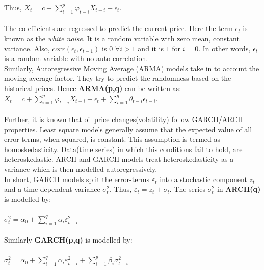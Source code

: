 \documentclass[runningheads]{llncs}
\begin{document}
\noindent Thus, $ X_{t} = c + \sum\limits_{i=1}^p \varphi_{t-i}X_{t-i} + \epsilon_{t}$.\\\\

\noindent The co-efficients are regressed to predict the current price. Here the term $\epsilon_{t}$ is known as the \textit{white noise}. It is a random variable with zero mean, constant variance. Also, $corr(\epsilon_t,\epsilon_{t-1})$ is $0$ $\forall i>1$ and it is $1$ for $i=0$. In other words, $\epsilon_{t}$ is a random variable with no auto-correlation.\\

\noindent Similarly, Autoregressive Moving Average (ARMA) models take in to account the moving average factor. They try to predict the randomness based on the historical prices.  Hence \textbf{ARMA(p,q)} can be written as:\\

$ X_{t} = c + \sum\limits_{i=1}^p \varphi_{t-i}X_{t-i} + \epsilon_{t} + \sum\limits_{i=1}^q \theta_{t-i}\epsilon_{t-i}$.\\
\\

\noindent Further, it is known that oil price changes(volatility) follow GARCH/ARCH properties. Least square models generally assume that the expected value of all error terms, when squared, is constant. This assumption is termed as homoskedasticity. Data(time series) in which this conditions fail to hold, are heteroskedastic. ARCH and GARCH models treat heteroskedasticity as a variance which is then modelled autoregressively.\cite{engle}\\

\noindent In short, GARCH models split the error-terms $\varepsilon_t$ into a stochastic component $z_{t}$ and a time dependent variance $\sigma^2_{t}$. Thus, $ \varepsilon_t = z_{t} + \sigma_{t}$. The series $\sigma^2_{t}$ in \textbf{ARCH(q)} is modelled by:\\\\

$\sigma^2_{t} = \alpha_{0} + \sum\limits_{i=1}^q \alpha_{i}\varepsilon_{t-i}^2 $\\\\

\noindent Similarly \textbf{GARCH(p,q)} is modelled by:\\\\

$\sigma^2_{t} = \alpha_{0} + \sum\limits_{i=1}^q \alpha_{i}\varepsilon_{t-i}^2 + \sum\limits_{i=1}^p \beta_{i}\sigma_{t-i}^2 $\\\\
\end{document}
